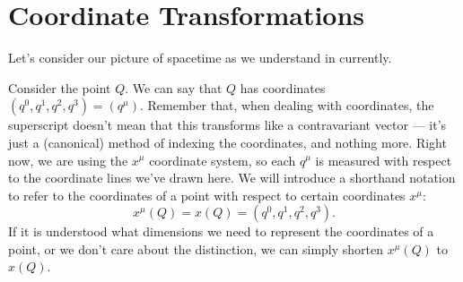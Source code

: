 \chapter{Coordinate Transformations}
Let's consider our picture of spacetime as we understand in currently.
\begin{figure}[h]
    \centering
\end{figure}
\noindent
Consider the point $Q$.
We can say that $Q$ has coordinates $(q^0, q^1, q^2, q^3) = (q^\mu)$.
Remember that, when dealing with coordinates, the superscript doesn't mean that this transforms like a contravariant vector --- it's just a (canonical) method of indexing the coordinates, and nothing more.
Right now, we are using the $x^\mu$ coordinate system, so each $q^\mu$ is measured with respect to the coordinate lines we've drawn here.
We will introduce a shorthand notation to refer to the coordinates of a point with respect to certain coordinates $x^\mu$:
\[ x^\mu(Q) = x(Q) = (q^0, q^1, q^2, q^3). \]
If it is understood what dimensions we need to represent the coordinates of a point, or we don't care about the distinction, we can simply shorten $x^\mu(Q)$ to $x(Q)$.

